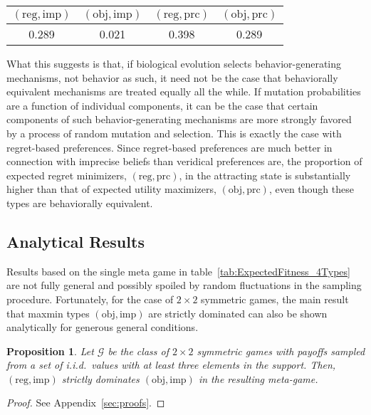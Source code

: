 \documentclass[fleqn,reqno,12pt]{article}
\theoremstyle{Satz}
\newtheorem{proposition}{Proposition}
\theoremstyle{Bsp}
\begin{document}
\begin{center}
  \begin{tabular}{cccc}
    $(\text{reg}, \text{imp})$ & $(\text{obj}, \text{imp})$ & $(\text{reg},
      \text{prc})$ & $(\text{obj}, \text{prc})$ \\ \hline
    0.289  & 0.021 &   0.398 &    0.289 
  \end{tabular}
\end{center}

What this suggests is that, if biological evolution selects behavior-generating mechanisms, not
behavior as such, it need not be the case that behaviorally equivalent mechanisms are treated
equally all the while. If mutation probabilities are a function of individual components, it can be the case that
certain components of such behavior-generating mechanisms are more strongly favored by a process of random mutation and
selection. This is exactly the case with regret-based preferences. Since regret-based preferences are much better in connection with imprecise
beliefs than veridical preferences are, the proportion of expected regret minimizers,
$(\text{reg}, \text{prc})$, in the attracting state is substantially higher than that of
expected utility maximizers, $(\text{obj}, \text{prc})$, even though these types are
behaviorally equivalent.

\subsection{Analytical Results}
\label{sec:analytical-results}

Results based on the single meta game in table~\ref{tab:ExpectedFitness_4Types} are not fully general and possibly spoiled by random
fluctuations in the sampling procedure. Fortunately, for the case of $2 \times 2$ symmetric
games, the main result that maxmin types $(\text{obj}, \text{imp})$ are strictly dominated can
also be shown analytically for generous general conditions.

\begin{proposition} \label{proposition1}
  Let $\mathcal{G}$ be the class of $2 \times 2$ symmetric games with payoffs sampled from a
  set of i.i.d.~values with at least three elements in the support. Then,
  $(\text{reg}, \text{imp})$ strictly dominates $(\text{obj}, \text{imp})$ in the resulting
  meta-game.
\end{proposition}

\begin{proof}
See Appendix~\ref{sec:proofs}.
\end{proof}
\end{document}
